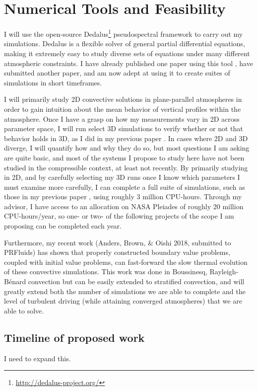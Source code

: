 \documentclass[aps, pre, onecolumn, nofootinbib, notitlepage, groupedaddress, amsfonts, amssymb, amsmath, longbibliography]{revtex4-1}
\newcommand{\RB}{Rayleigh-B\'{e}nard }
\begin{document}
\section{Numerical Tools and Feasibility}
I will use the open-source Dedalus\footnote{\url{http://dedalus-project.org/}} pseudospectral framework 
\cite{burns&all2016} to carry out my simulations.  
Dedalus is a flexible solver of general partial differential equations,
making it extremely easy to study diverse sets of equations under many different atmospheric
constraints.  I have already published one paper using this tool \cite{anders&brown2017},
have submitted another paper, and am now adept at using it to create suites of simulations
in short timeframes.

I will primarily study 2D convective solutions in plane-parallel atmospheres in order to gain
intuition about the mean behavior of vertical profiles within the atmosphere.  Once I have a grasp
on how my measurements vary in 2D across parameter space, I will run select 3D simulations to
verify whether or not that behavior holds in 3D, as I did in my previous paper \cite{anders&brown2017}.
In cases where 2D and 3D diverge, I will quantify how and why they do so, but most questions I am
asking are quite basic, and most of the systems I propose to study here have not been studied
in the compressible context, at least not recently.  By primarily studying in 2D, and by carefully
selecting my 3D runs once I know which parameters I must examine more carefully, I can complete
a full suite of simulations, such as those in my previous paper \cite{anders&brown2017}, using
roughly 3 million CPU-hours.  Through my advisor, I have access to an allocation on NASA Pleiades
of roughly 20 million CPU-hours/year, so one- or two- of the following projects of the scope I am
proposing can be completed each year.

Furthermore, my recent work (Anders, Brown, \& Oishi 2018, submitted to PRFluids) has
shown that properly constructed boundary value problems, coupled with initial value problems,
can fast-forward the slow thermal evolution of these convective simulations.  This work was done in 
Boussinesq, \RB convection but can be easily extended to stratified convection, and will greatly
extend both the number of simulations we are able to complete and the level of turbulent driving
(while attaining converged atmospheres) that we are able to solve.



\subsection{Timeline of proposed work}
I need to expand this.
\end{document}
